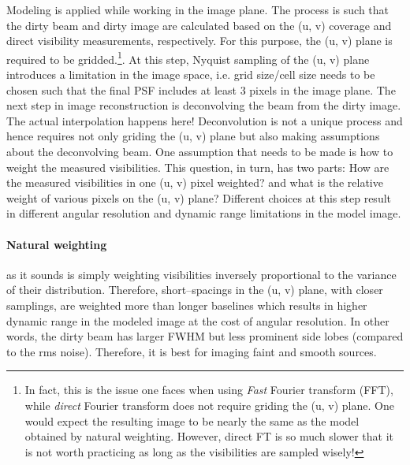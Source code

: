 \documentclass[a4wide,12pt]{book}
\begin{document}
{Modeling is applied while working in the image plane. The process is such that the dirty beam and dirty image are calculated based on the (u, v) coverage and direct visibility measurements, respectively. For this purpose, the (u, v) plane is required to be gridded.\footnote{In fact, this is the issue one faces when using \emph{Fast} Fourier transform (FFT), while \emph{direct} Fourier transform does not require griding the (u, v) plane. One would expect the resulting image to be nearly the same as the model obtained by natural weighting. However, direct FT is so much slower that it is not worth practicing as long as the visibilities are sampled wisely!}. At this step, Nyquist sampling of the (u, v) plane introduces a limitation in the image space, i.e. grid size/cell size needs to  be chosen such that the final PSF includes at least 3 pixels in the image plane. The next step in image reconstruction is deconvolving the beam from the dirty image. The actual interpolation happens here! Deconvolution is not a unique process and hence requires not only griding the (u, v) plane but also making assumptions about the deconvolving beam. One assumption that needs to be made is how to weight the measured visibilities. This question, in turn, has two parts: How are the measured visibilities in one (u, v) pixel weighted? and what is the relative weight of various pixels on the (u, v) plane? Different choices at this step result in different angular resolution and dynamic range limitations in the model image.

\paragraph*{Natural weighting} as it sounds is simply weighting visibilities inversely proportional to the variance of their distribution.
Therefore, short--spacings in the (u, v) plane, with closer samplings, are weighted more than longer baselines which results in higher dynamic range in the modeled image at the cost of angular resolution. In other words, the dirty beam has larger FWHM but less prominent side lobes (compared to the rms noise). Therefore, it is best for imaging faint and smooth sources. 

}
\end{document}
